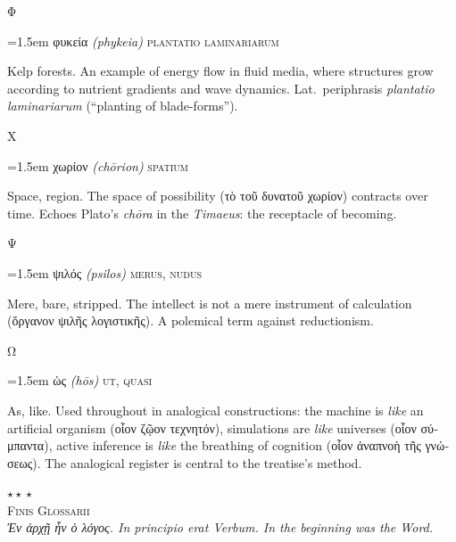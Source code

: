 \documentclass[12pt, oneside, openany]{memoir}
\newcommand{\gk}[1]{\textgreek{#1}}
\newcommand{\gkblue}[1]{{\color{greekblue}\textgreek{#1}}}
\newcommand{\gentry}[4]{%
  \noindent\hangindent=1.5em
  {\gkblue{#1}}\enspace
  {\itshape(#2)}\enspace
  {\color{rubricate}\textperiodcentered}\enspace
  {\scshape #3}\par
  \hspace*{1.5em}%
  \parbox[t]{\dimexpr\linewidth-1.5em\relax}{\strut#4\strut}%
  \par\addvspace{6pt}}
\begin{document}
\bigskip
{\centering\color{rubricate}\large\scshape Φ \par}\medskip

\gentry{φυκεία}{phykeia}{plantatio laminariarum}
{Kelp forests. An example of energy flow in fluid media, where structures grow according to nutrient gradients and wave dynamics. Lat.\ periphrasis \textit{plantatio laminariarum} (``planting of blade-forms'').}

\bigskip
{\centering\color{rubricate}\large\scshape Χ \par}\medskip

\gentry{χωρίον}{ch\={o}rion}{spatium}
{Space, region. The space of possibility (\gk{τὸ τοῦ δυνατοῦ χωρίον}) contracts over time. Echoes Plato's \textit{ch\={o}ra} in the \textit{Timaeus}: the receptacle of becoming.}

\bigskip
{\centering\color{rubricate}\large\scshape Ψ \par}\medskip

\gentry{ψιλός}{psilos}{merus, nudus}
{Mere, bare, stripped. The intellect is not a mere instrument of calculation (\gk{ὄργανον ψιλῆς λογιστικῆς}). A polemical term against reductionism.}

\bigskip
{\centering\color{rubricate}\large\scshape Ω \par}\medskip

\gentry{ὡς}{h\={o}s}{ut, quasi}
{As, like. Used throughout in analogical constructions: the machine is \emph{like} an artificial organism (\gk{οἷον ζῷον τεχνητόν}), simulations are \emph{like} universes (\gk{οἷον σύμπαντα}), active inference is \emph{like} the breathing of cognition (\gk{οἷον ἀναπνοὴ τῆς γνώσεως}). The analogical register is central to the treatise's method.}

\begin{center}
  {\color{capgold}\large$\star\!\star\!\star$}\\[8pt]
  {\small\scshape\color{rubricate} Finis Glossarii}\\[4pt]
  {\footnotesize\itshape\color{inkbrown}
    \gk{Ἐν ἀρχῇ ἦν ὁ λόγος.}\quad
    In principio erat Verbum.\quad
    In the beginning was the Word.}
\end{center}
\end{document}
